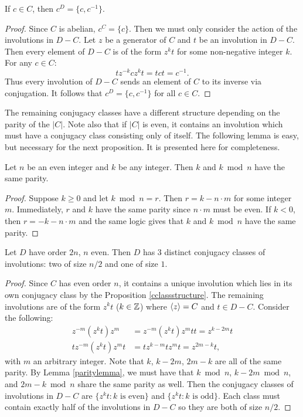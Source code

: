 \documentclass[main.tex]{subfiles}
\begin{document}
\begin{proposition}\label{cclassstructure}
If $c \in C$, then $c^D = \{c, c^{-1}\}$.
\end{proposition}

\begin{proof}
Since $C$ is abelian, $c^C = \{c\}$. Then we must only consider the action of the involutions in $D - C$. Let $z$ be a generator of $C$ and $t$ be an involution in $D - C$. Then every element of $D - C$ is of the form $z^k t$ for some non-negative integer $k$. For any $c \in C$:
$$t z^{-k} c z^k t = t c t = c^{-1} \text{.}$$
Thus every involution of $D - C$ sends an element of $C$ to its inverse via conjugation. It follows that $c^D = \{c, c^{-1}\}$ for all $c \in C$.
\end{proof}

The remaining conjugacy classes have a different structure depending on the parity of the $|C|$.  Note also that if $|C|$ is even, it contains an involution which must have a conjugacy class consisting only of itself. The following lemma is easy, but necessary for the next proposition. It is presented here for completeness.

\begin{lemma}\label{paritylemma}
Let $n$ be an even integer and $k$ be any integer. Then $k$ and $k \bmod n$ have the same parity.
\end{lemma}

\begin{proof}
Suppose $k \ge 0$ and let $k \bmod n = r$. Then $r = k - n \cdot m$ for some integer $m$. Immediately, $r$ and $k$ have the same parity since $n \cdot m$ must be even. If $k < 0$, then $r = -k - n \cdot m$ and the same logic gives that $k$ and $k \bmod n$ have the same parity.
\end{proof}

\begin{proposition}\label{evendihedralclass}
Let $D$ have order $2n$, $n$ even. Then $D$ has 3 distinct conjugacy classes of involutions: two of size $n/2$ and one of size $1$.
\end{proposition}

\begin{proof}
Since $C$ has even order $n$, it contains a unique involution which lies in its own conjugacy class by the Proposition \ref{cclassstructure}. The remaining involutions are of the form $z^k t$ ($k \in \mathbb{Z}$) where $\langle z \rangle = C$ and $t \in D - C$. Consider the following:
\begin{align*}
z^{-m} (z^k t) z^m &= z^{-m} (z^k t) z^m t t = z^{k-2m} t \\
t z^{-m} (z^k t) z^m t &= t z^{k-m} t z^m t= z^{2m-k} t \text{,}
\end{align*}
with $m$ an arbitrary integer. Note that $k$, $k-2m$, $2m-k$ are all of the same parity. By Lemma \ref{paritylemma}, we must have that $k \bmod n$, $k-2m \bmod n$, and $2m-k \bmod n$ share the same parity as well. Then the conjugacy classes of involutions in $D - C$ are $\{z^k t : k \text{ is even}\}$ and $\{z^k t : k \text{ is odd}\}$. Each class must contain exactly half of the involutions in $D - C$ so they are both of size $n/2$.
\end{proof}
\end{document}
